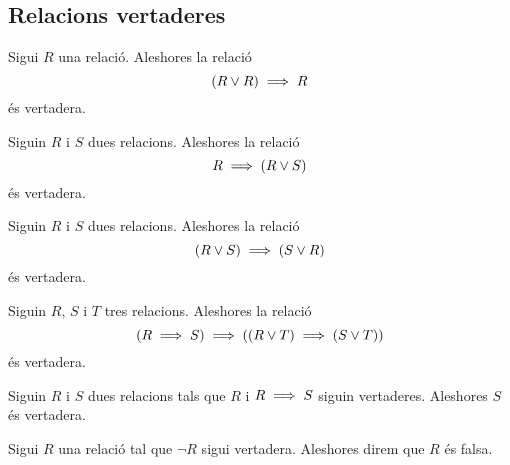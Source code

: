 \documentclass[../../Main.tex]{subfiles}
\begin{document}
	\subsection{Relacions vertaderes}
	\begin{axiom}
		\label{axiom:relacions 1}
		Sigui \(R\) una relació. Aleshores la relació
		\[(R\lor R)\implies R\]
		és vertadera.
	\end{axiom}
	\begin{axiom}
		\label{axiom:relacions 2}
		Siguin \(R\) i \(S\) dues relacions. Aleshores la relació
		\[R\implies(R\lor S)\]
		és vertadera.
	\end{axiom}
	\begin{axiom}
		\label{axiom:relacions 3}
		Siguin \(R\) i \(S\) dues relacions. Aleshores la relació
		\[(R\lor S)\implies(S\lor R)\]
		és vertadera.
	\end{axiom}
	\begin{axiom}
		\label{axiom:relacions 4}
		Siguin \(R\), \(S\) i \(T\) tres relacions. Aleshores la relació
		\[(R\implies S)\implies((R\lor T)\implies(S\lor T))\]
		és vertadera.
	\end{axiom}
	\begin{axiom}
		\label{axiom:relacions 5}
		Siguin \(R\) i \(S\) dues relacions tals que \(R\) i \(R\implies S\) siguin vertaderes. Aleshores \(S\) és vertadera.
	\end{axiom}
	\begin{definition}
		Sigui \(R\) una relació tal que \(\lnot R\) sigui vertadera. Aleshores direm que \(R\) és falsa.
	\end{definition}
\end{document}
